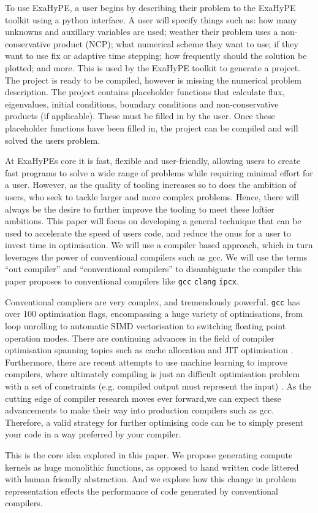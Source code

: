 To use ExaHyPE, a user begins by describing their problem to the ExaHyPE toolkit using a python interface.
A user will specify things such as: how many unknowns and auxillary variables are used; weather their problem uses a non-conservative product (NCP); what numerical scheme they want to use; if they want to use fix or adaptive time stepping; how frequently should the solution be plotted; and more.
This is used by the ExaHyPE toolkit to generate a project.
The project is ready to be compiled, however is missing the numerical problem description.
The project contains placeholder functions that calculate flux, eigenvalues, initial conditions, boundary conditions and non-conservative products (if applicable).   
These must be filled in by the user.
Once these placeholder functions have been filled in, the project can be compiled and will solved the users problem.


At ExaHyPEs core it is fast, flexible and user-friendly, allowing users to create fast programs to solve a wide range of problems while requiring minimal effort for a user.
However, as the quality of tooling increases so to does the ambition of users, who seek to tackle larger and more complex problems.
Hence, there will always be the desire to further improve the tooling to meet these loftier ambitions.
This paper will focus on developing a general technique that can be used to accelerate the speed of users code, and reduce the onus for a user to invest time in optimisation.
We will use a compiler based approach, which in turn leverages the power of conventional compilers such as gcc.
We will use the terms ``out compiler'' and ``conventional compilers'' to disambiguate the compiler this paper proposes to conventional compilers like \texttt{gcc} \texttt{clang} \texttt{ipcx}.  


Conventional compliers are very complex, and tremendously powerful.
\texttt{gcc} has over 100 optimisation flags, encompassing a huge variety of optimisations, from loop unrolling to automatic SIMD vectorisation to switching floating point operation modes.
There are continuing advances in the field of compiler optimisation spanning topics such as cache allocation and JIT optimisation \cite{weak-compiler-survey}.
Furthermore, there are recent attempts to use machine learning to improve compilers, where ultimately compiling is just an difficult optimisation problem with a set of constraints (e.g. compiled output must represent the input) \cite{compiler-ml-opt}.
As the cutting edge of compiler research moves ever forward,we can expect these advancements to make their way into production compilers such as gcc.
Therefore, a valid strategy for further optimising code can be to simply present your code in a way preferred by your compiler.

This is the core idea explored in this paper.
We propose generating compute kernels as huge monolithic functions, as opposed to hand written code littered with human friendly abstraction.
And we explore how this change in problem representation effects the performance of code generated by conventional compilers.

